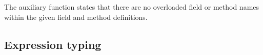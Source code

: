 \documentclass[a4paper,USenglish]{tex/lipics-v2016}
\begin{document}

\begin{mathpar}
\end{mathpar}

The  auxiliary function states that there are no overloaded 
field or method names within the given field and method definitions. \\


\begin{mathpar}



\end{mathpar}


\begin{mathpar}
\end{mathpar}


\begin{mathpar}

\end{mathpar}



\subsection{Expression typing}
\end{document}
